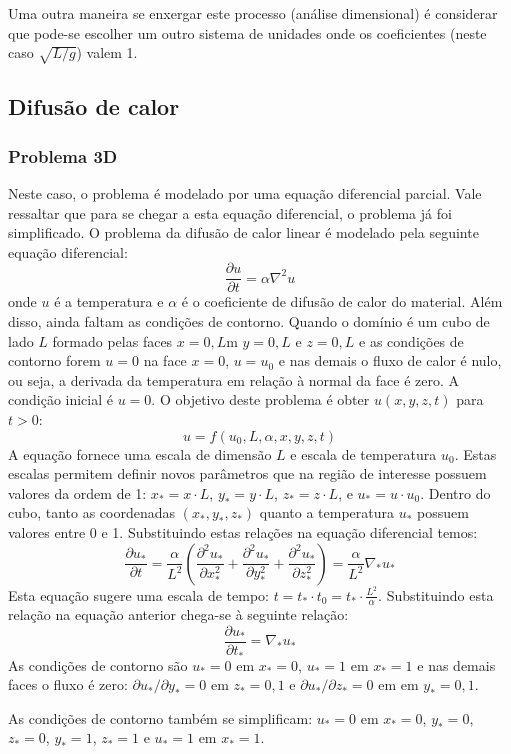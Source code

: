 \documentclass[article,12pt,oneside,a4paper,english,brazil,sumario=tradicional]{abntex2}
\newcommand{\pd}{\ensuremath{\partial}}
\begin{document}
Uma outra maneira se enxergar este processo (análise dimensional) é considerar que pode-se escolher um outro sistema de unidades onde os coeficientes (neste caso $\sqrt{L/g}$) valem 1.

\subsection{Difusão de calor}
\subsubsection{Problema 3D}
Neste caso, o problema é modelado por uma equação diferencial parcial. Vale ressaltar que para se chegar a esta equação diferencial, o problema já foi simplificado. O problema da difusão de calor linear é modelado pela seguinte equação diferencial:
\[
\frac{\partial u}{\partial t} = \alpha\nabla^2 u
\]
onde $u$ é a temperatura e $\alpha$ é o coeficiente de difusão de calor do material. Além disso, ainda faltam as condições de contorno. Quando o domínio é um cubo de lado $L$ formado pelas faces $x=0,L$m $y=0,L$ e $z=0,L$ e as condições de contorno forem $u=0$ na face $x=0$, $u=u_0$ e nas demais o fluxo de calor é nulo, ou seja, a derivada da temperatura em relação à normal da face é zero. A condição inicial é $u=0$. O objetivo deste problema é obter $u(x,y,z,t)$ para $t>0$:
\[
u = f(u_0, L, \alpha, x, y, z, t)
\]
A equação fornece uma escala de dimensão $L$ e escala de temperatura $u_0$. Estas escalas permitem definir novos parâmetros que na região de interesse possuem valores da ordem de 1: $x_* = x\cdot L$, $y_* = y\cdot L$, $z_* = z\cdot L$, e $u_* = u\cdot u_0$. Dentro do cubo, tanto as coordenadas $(x_*, y_*, z_*)$ quanto a temperatura $u_*$  possuem valores entre 0 e 1. Substituindo estas relações na equação diferencial temos:
\[
\frac{\pd u_*}{\pd t} = \frac{\alpha}{L^2}\left(\frac{\pd^2 u_*}{\pd x_*^2} + \frac{\pd^2 u_*}{\pd y_*^2} + \frac{\pd^2 u_*}{\pd z_*^2} \right) = \frac{\alpha}{L^2} \nabla_* u_*
\]
Esta equação sugere uma escala de tempo: $t = t_*\cdot t_0 = t_* \cdot \frac{L^2}{\alpha}$. Substituindo esta relação na equação anterior chega-se à seguinte relação:
\[
\frac{\pd u_*}{\pd t_*} =\nabla_* u_*
\]
As condições de contorno são $u_*=0$ em $x_*=0$, $u_*=1$ em $x_*=1$ e nas demais faces o fluxo é zero: $\pd u_*/\pd y_* = 0$ em $z_*=0,1$ e $\pd u_*/\pd z_* = 0$ em em $y_*=0,1$.


As condições de contorno também se simplificam: $u_*=0$ em $x_*=0$, $y_*=0$, $z_*=0$, $y_*=1$, $z_*=1$ e $u_* = 1$ em $x_* = 1$. 
\end{document}
